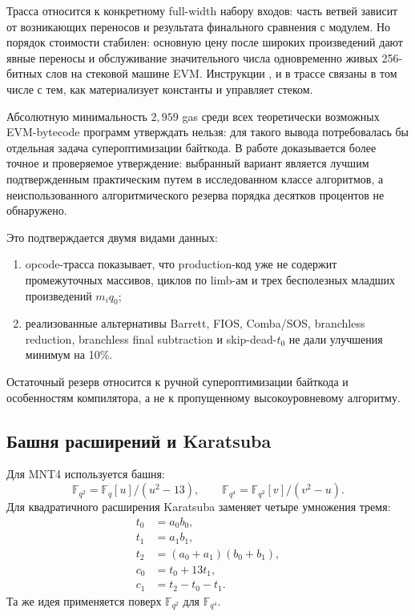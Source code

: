 \documentclass[12pt,a4paper]{article}
\newcommand{\Fq}{\mathbb{F}_q}
\newcommand{\code}[1]{\texttt{\detokenize{#1}}}
\begin{document}
Трасса относится к конкретному full-width набору входов: часть ветвей зависит
от возникающих переносов и результата финального сравнения с модулем. Но
порядок стоимости стабилен: основную цену после широких произведений дают
явные переносы и обслуживание значительного числа одновременно живых
256-битных слов на стековой машине EVM. Инструкции \code{MLOAD},
\code{MSTORE} и \code{CODECOPY} в трассе связаны в том числе с тем, как
\code{solc --via-ir} материализует константы и управляет стеком.

Абсолютную минимальность $2{,}959$ gas среди всех теоретически возможных
EVM-bytecode программ утверждать нельзя: для такого вывода потребовалась бы
отдельная задача супероптимизации байткода. В работе доказывается более
точное и проверяемое утверждение: выбранный вариант является лучшим
подтвержденным практическим путем в исследованном классе алгоритмов, а
неиспользованного алгоритмического резерва порядка десятков процентов не
обнаружено.

Это подтверждается двумя видами данных:
\begin{enumerate}
    \item opcode-трасса показывает, что production-код уже не содержит
    промежуточных массивов, циклов по limb-ам и трех бесполезных младших
    произведений $m_iq_0$;
    \item реализованные альтернативы Barrett, FIOS, Comba/SOS, branchless
    reduction, branchless final subtraction и skip-dead-$t_0$ не дали
    улучшения минимум на 10\%.
\end{enumerate}
Остаточный резерв относится к ручной супероптимизации байткода и особенностям
компилятора, а не к пропущенному высокоуровневому алгоритму.

\subsection{Башня расширений и Karatsuba}

Для MNT4 используется башня:
\[
    \mathbb{F}_{q^2}=\Fq[u]/(u^2-13),
    \qquad
    \mathbb{F}_{q^4}=\mathbb{F}_{q^2}[v]/(v^2-u).
\]
Для квадратичного расширения Karatsuba заменяет четыре умножения тремя:
\[
\begin{aligned}
    t_0&=a_0b_0,\\
    t_1&=a_1b_1,\\
    t_2&=(a_0+a_1)(b_0+b_1),\\
    c_0&=t_0+13t_1,\\
    c_1&=t_2-t_0-t_1.
\end{aligned}
\]
Та же идея применяется поверх $\mathbb{F}_{q^2}$ для $\mathbb{F}_{q^4}$.
\end{document}
